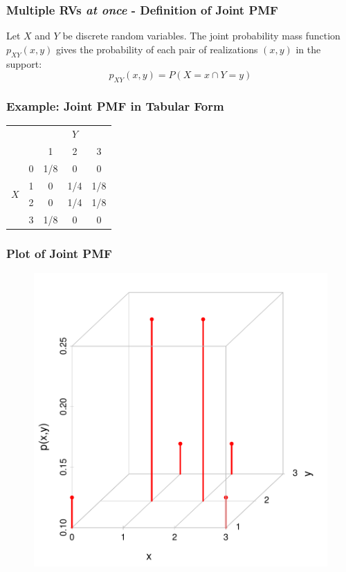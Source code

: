 \documentclass[handout]{beamer}
\begin{document}
\begin{frame}
  \frametitle{Multiple RVs \emph{at once} - Definition of Joint PMF}
Let $X$ and $Y$ be discrete random variables. The joint probability mass function $p_{XY}(x,y)$ gives the probability of each pair of realizations $(x,y)$ in the support:
\Large
 $$\boxed{p_{XY}(x,y) = P(X = x \cap Y=y)}$$

\end{frame}
\begin{frame}
\frametitle{Example: Joint PMF in Tabular Form}

\begin{table}
\begin{tabular}{|cc|ccc|}
\hline
&&\multicolumn{3}{c|}{$Y$}\\
&&1 & 2&3\\
\hline
\multirow{4}{*}{$X$}
&0& \multicolumn{1}{|c}{\alert{1/8}} & \alert{0}& \alert{0}\\
&1& \multicolumn{1}{|c}{\alert{0}} & \alert{1/4}&\alert{1/8}\\
&2& \multicolumn{1}{|c}{\alert{0}} & \alert{1/4}&\alert{1/8}\\
&3& \multicolumn{1}{|c}{\alert{1/8}} & \alert{0}&\alert{0}\\
\hline
\end{tabular}
\end{table}

\end{frame}
\begin{frame}
\frametitle{Plot of Joint PMF}
\begin{figure}
	\includegraphics[scale = 0.53]{./images/joint_dist}
\end{figure}

\end{frame}
\end{document}
